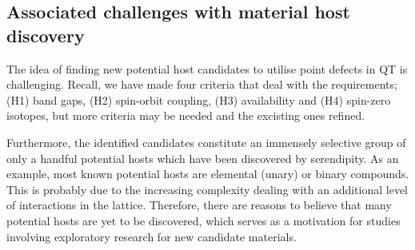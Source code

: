 \subsection{Associated challenges with material host discovery}

The idea of finding new potential host candidates to utilise point defects in QT is challenging. Recall, we have made four criteria that deal with the requirements; (H1) band gaps, (H2) spin-orbit coupling, (H3) availability and (H4) spin-zero isotopes, but more criteria may be needed and the excisting ones refined.%

Furthermore, the identified candidates constitute an immensely selective group of only a handful potential hosts which have been discovered by serendipity. As an example, most known potential hosts are elemental (unary) or binary compounds. This is probably due to the increasing complexity dealing with an additional level of interactions in the lattice. Therefore, there are reasons to believe that many potential hosts are yet to be discovered, which serves as a motivation for studies involving exploratory research for new candidate materials.






\clearpage
